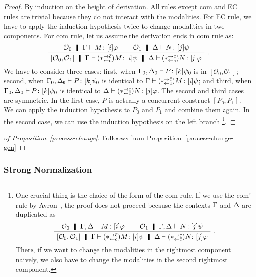 {  \begin{proposition}
   \label{process-change-gen}
  \end{proposition}
  \begin{proof}
   By induction on the height of derivation.
   All rules except com and EC rules are trivial because they do not interact
   with the modalities.  For EC rule, we have to apply the induction
   hypothesis twice to change modalities in two components.  For com rule,
   let us assume the derivation ends in com rule as:
   \[
   \BinaryRule
   {$\hypert_0\hmid\G\tr\tj{M}{[i]\varphi}$}
   {$\hypert_1\hmid\D\tr\tj{N}{[j]\psi}$}
   {}
   {$\cotuple{\hypert_0,\hypert_1}\hmid\Gamma\tr\tj{(\comodL)M}{[i]\psi}\hmid
   \Delta\tr\tj{(\comodR)N}{[j]\varphi}$}\enspace.
   \]
   We have to consider three cases:  first, when
   $\Gamma_0,\Delta_0\vdash{P} \colon{[k]\psi_0}$ is in $[\mathcal O_0, \mathcal O_1]$;
   second, when $\Gamma_0,\Delta_0\vdash{P} \colon{[k]\psi_0}$ is identical to
   $ \Gamma\vdash{(\ast^{\rightarrow {\bar{c}}}_{\leftarrow{c}})M} \colon{[i]\psi} $; and third,
   when $\Gamma_0,\Delta_0\vdash{P} \colon{[k]\psi_0}$ is identical to
   $\Delta\vdash{(\ast^{\rightarrow {c}}_{\leftarrow{\bar{c}}})N} \colon{[j]\varphi}$.
   The second and third cases are symmetric.  In the first case, $P$ is
   actually a concurrent construct $[P_0,P_1]$. We can apply the
   induction hypothesis to $P_0$ and $P_1$ and combine them again.
   In the second case, we can use the induction hypothesis on the left branch%
   \footnote{One crucial thing is the choice of the form of the com rule.
   If we use the com' rule by Avron~\cite{avron91}, the proof does not
   proceed because the contexts $\Gamma$ and $\Delta$ are duplicated as
   \[
   \BinaryRule
   {$\hypert_0\hmid\G,\D\tr\tj{M}{[i]\varphi}$}
   {$\hypert_1\hmid\G,\D\tr\tj{N}{[j]\psi}$}
   {}
   {$\cotuple{\hypert_0,\hypert_1}\hmid\G\tr\tj{(\comodL)M}{[i]\psi}\hmid
   \D\tr\tj{(\comodR)N}{[j]\varphi}$}\enspace.
   \]
   There, if we want to change the modalities in the rightmost component
   naively, we also have to change the modalities in the second
   rightmost component.
   }.
  \end{proof}

 \begin{proof}[of Proposition~\ref{process-change}]
  Folloows from Proposition~\ref{process-change-gen}
 \end{proof}

\subsubsection{Strong Normalization}


}
